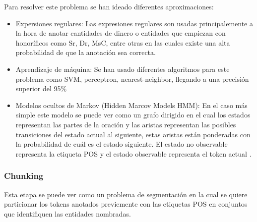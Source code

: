 \documentclass[runningheads]{llncs}
\begin{document}
Para resolver este problema se han ideado diferentes aproximaciones:

\begin{itemize}

\item Expersiones regulares: Las expresiones regulares son usadas principalemente a la hora de anotar cantidades de dinero o entidades que empiezan con honoríficos como Sr, Dr, MsC, entre otras en las cuales existe una alta probabilidad de que la anotación sea correcta.

\item Aprendizaje de máquina: Se han usado diferentes algoritmos para este problema como SVM, perceptron, nearest-neighbor, llegando a una precisión superior del 95\% \cite{postag}

\item Modelos ocultos de Markov (Hidden Marcov Models HMM): En el caso más simple este modelo se puede ver como un grafo dirigido en el cual los estados representan las partes de la oración y las aristas representan las posibles transiciones del estado actual al siguiente, estas aristas están ponderadas con la probabilidad de cuál es el estado siguiente. El estado no observable representa la etiqueta POS y el estado observable representa el token actual \cite{hmm}.

\end{itemize}

\subsubsection{Chunking}

%


Esta etapa se puede ver como un problema de segmentación en la cual se quiere particionar los tokens anotados previemente con las etiquetas POS en conjuntos que identifiquen las entidades nombradas.
\end{document}
